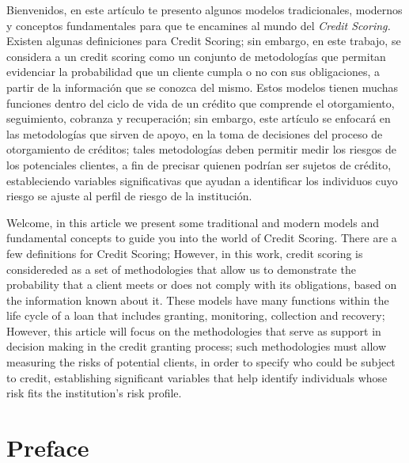\documentclass[
  letterpaper,
]{tex/svmono}
\begin{document}
Bienvenidos, en este artículo te presento algunos modelos tradicionales,
modernos y conceptos fundamentales para que te encamines al mundo del
\emph{Credit Scoring.} Existen algunas definiciones para Credit Scoring;
sin embargo, en este trabajo, se considera a un credit scoring como un
conjunto de metodologías que permitan evidenciar la probabilidad que un
cliente cumpla o no con sus obligaciones, a partir de la información que
se conozca del mismo. Estos modelos tienen muchas funciones dentro del
ciclo de vida de un crédito que comprende el otorgamiento, seguimiento,
cobranza y recuperación; sin embargo, este artículo se enfocará en las
metodologías que sirven de apoyo, en la toma de decisiones del proceso
de otorgamiento de créditos; tales metodologías deben permitir medir los
riesgos de los potenciales clientes, a fin de precisar quienen podrían
ser sujetos de crédito, estableciendo variables significativas que
ayudan a identificar los individuos cuyo riesgo se ajuste al perfil de
riesgo de la institución.

Welcome, in this article we present some traditional and modern models
and fundamental concepts to guide you into the world of Credit Scoring.
There are a few definitions for Credit Scoring; However, in this work,
credit scoring is considereded as a set of methodologies that allow us
to demonstrate the probability that a client meets or does not comply
with its obligations, based on the information known about it. These
models have many functions within the life cycle of a loan that includes
granting, monitoring, collection and recovery; However, this article
will focus on the methodologies that serve as support in decision making
in the credit granting process; such methodologies must allow measuring
the risks of potential clients, in order to specify who could be subject
to credit, establishing significant variables that help identify
individuals whose risk fits the institution's risk profile.


\hypertarget{preface}{%
\chapter*{Preface}\label{preface}}


\hypertarget{section}{%
\section*{}\label{section}}
\end{document}
